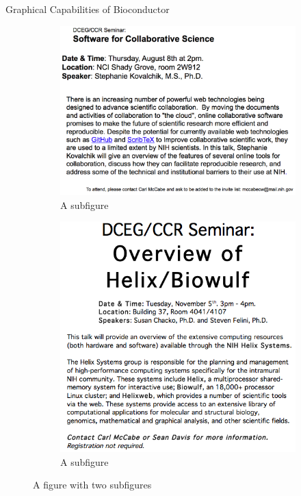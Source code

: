\documentclass[final]{beamer}
\begin{document}
\begin{frame}[t]
\begin{columns}[t]
    \begin{column}{0.3\linewidth}
      \begin{block}{Graphical Capabilities of Bioconductor}
        \begin{figure}
          \centering
          \begin{subfigure}{.45\textwidth}
            \centering
            \includegraphics[width=1\linewidth]{collabSoftwareTools}
            \caption{A subfigure}
            \label{fig:sub1}
          \end{subfigure}
          \begin{subfigure}{.45\textwidth}
            \centering
            \includegraphics[width=1\linewidth]{helixOverview}
            \caption{A subfigure}
            \label{fig:sub2}
          \end{subfigure}
          \caption{A figure with two subfigures}
          \label{fig:test}
        \end{figure}
      \end{block}
    \end{column}


\end{columns}
\end{frame}
\end{document}
